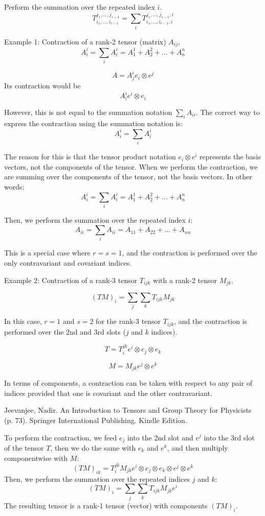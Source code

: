 Perform the summation over the repeated index $i$.
$$
T_{i_1, \dots, i_{r-1}}^{j_1, \dots, j_{s-1}} = \sum_i T_{i_1, \dots, i_{r-1}, i}^{j_1, \dots, j_{s-1}, i}
$$


Example 1: Contraction of a rank-2 tensor (matrix) $A_{ij}$,
$$
A^i_i = \sum_i A^i_i = A^1_1 + A^2_2 + ... + A^n_n
$$

$$
A = A^i_j e_i \otimes e^j
$$
Its contraction would be
$$
A_{i}^{i} e^i \otimes e_i
$$

However, this is not equal to the summation notation $\sum_i A_{ii}$.
The correct way to express the contraction using the summation notation is:
$$
A^i_i = \sum_i A^i_i
$$

The reason for this is that the tensor product notation $e_i \otimes e^i$
represents the basis vectors, not the components of the tensor.
When we perform the contraction, we are summing over the components of the tensor, not the basis vectors.
In other words:
$$
A^i_i = \sum_i A^i_i = A^1_1 + A^2_2 + ... + A^n_n
$$

Then, we perform the summation over the repeated index $i$:
$$
A_{ii} = \sum_i A_{ii} = A_{11} + A_{22} + ... + A_{nn}
$$

This is a special case where $r = s = 1$,
and the contraction is performed over the only contravariant and covariant indices.



Example 2: Contraction of a rank-3 tensor $T_{ijk}$ with a rank-2 tensor $M_{jk}$.

$$
(TM)_i = \sum_j \sum_k T_{ijk} M_{jk}
$$

In this case, $r = 1$ and $s = 2$ for the rank-3 tensor $T_{ijk}$,
and the contraction is performed over the 2nd and 3rd slots ($j$ and $k$ indices).

$$
T = T_{i}^{jk} e^i \otimes e_j \otimes e_k
$$

$$
M = M_{jk} e^j \otimes e^k
$$

In terms of components, a  contraction can be taken with respect to any pair of indices
provided that one is  covariant and the other contravariant.

Jeevanjee, Nadir. An Introduction to Tensors and Group Theory for Physicists (p. 73). Springer International Publishing. Kindle Edition. 

To perform the contraction, we feed $e_j$ into the 2nd slot and $e^j$ into the 3rd slot of the tensor $T$,
then we do the same with $e_k$ and $e^k$,
and then multiply componentwise with $M$:
$$
(TM)_{ik} = T_{i}^{jk} M_{jk} e^i \otimes e_j \otimes e_k \otimes e^j \otimes e^k
$$
Then, we perform the summation over the repeated indices $j$ and $k$:
$$
(TM)_i = \sum_j \sum_k T_{ijk} M_{jk} e^i
$$
The resulting tensor is a rank-1 tensor (vector) with components $(TM)_i$.
